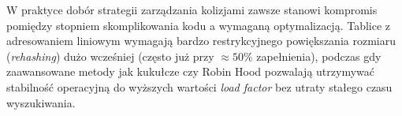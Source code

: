 \documentclass[12pt,a4paper]{article}
\begin{document}
W praktyce dobór strategii zarządzania kolizjami zawsze stanowi kompromis pomiędzy stopniem skomplikowania kodu a wymaganą optymalizacją. Tablice z adresowaniem liniowym wymagają bardzo restrykcyjnego powiększania rozmiaru (\textit{rehashing}) dużo wcześniej (często już przy $\approx 50\%$ zapełnienia), podczas gdy zaawansowane metody jak kukułcze czy Robin Hood pozwalają utrzymywać stabilność operacyjną do wyższych wartości \textit{load factor} bez utraty stałego czasu wyszukiwania.
\end{document}
